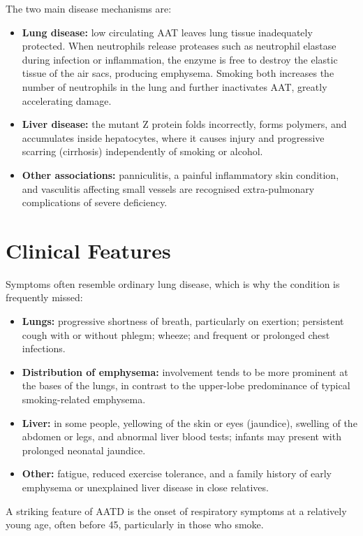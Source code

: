 The two main disease mechanisms are:

\begin{itemize}
    \item \textbf{Lung disease:} low circulating AAT leaves lung tissue inadequately protected. When neutrophils release proteases such as neutrophil elastase during infection or inflammation, the enzyme is free to destroy the elastic tissue of the air sacs, producing emphysema. Smoking both increases the number of neutrophils in the lung and further inactivates AAT, greatly accelerating damage.
    \item \textbf{Liver disease:} the mutant Z protein folds incorrectly, forms polymers, and accumulates inside hepatocytes, where it causes injury and progressive scarring (cirrhosis) independently of smoking or alcohol.
    \item \textbf{Other associations:} panniculitis, a painful inflammatory skin condition, and vasculitis affecting small vessels are recognised extra-pulmonary complications of severe deficiency.
\end{itemize}

\section*{Clinical Features}
Symptoms often resemble ordinary lung disease, which is why the condition is frequently missed:

\begin{itemize}
    \item \textbf{Lungs:} progressive shortness of breath, particularly on exertion; persistent cough with or without phlegm; wheeze; and frequent or prolonged chest infections.
    \item \textbf{Distribution of emphysema:} involvement tends to be more prominent at the bases of the lungs, in contrast to the upper-lobe predominance of typical smoking-related emphysema.
    \item \textbf{Liver:} in some people, yellowing of the skin or eyes (jaundice), swelling of the abdomen or legs, and abnormal liver blood tests; infants may present with prolonged neonatal jaundice.
    \item \textbf{Other:} fatigue, reduced exercise tolerance, and a family history of early emphysema or unexplained liver disease in close relatives.
\end{itemize}

A striking feature of AATD is the onset of respiratory symptoms at a relatively young age, often before 45, particularly in those who smoke.

